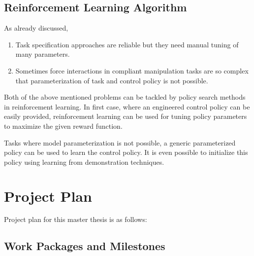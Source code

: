 \documentclass[thesis]{mas_proposal}
\begin{document}
\section{Reinforcement Learning Algorithm}

As already discussed, \begin{enumerate}
	\item Task specification approaches are reliable but they need manual tuning of many parameters.
	\item Sometimes force interactions in compliant manipulation tasks are so complex that parameterization of task and control policy is not possible. 
\end{enumerate}
Both of the above mentioned problems can be tackled by policy search methods in reinforcement learning. In first case, where an engineered control policy can be easily provided, reinforcement learning can be used for tuning policy parameters to maximize the given reward function.

Tasks where model parameterization is not possible, a generic parameterized policy can be used to learn the control policy. It is even possible to initialize this policy using learning from demonstration techniques.

\chapter{Project Plan}
Project plan for this master thesis is as follows:
\section{Work Packages and Milestones}
\end{document}
